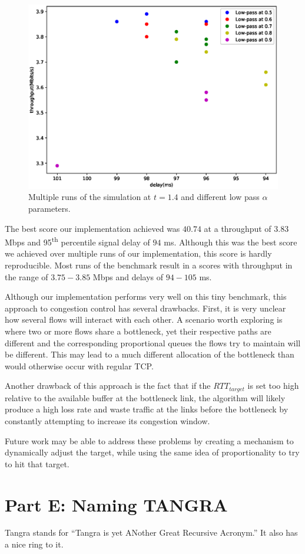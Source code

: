 \documentclass[12pt]{article}
\begin{document}
\begin{figure}[h]
\includegraphics[width=\textwidth,height=\textheight,keepaspectratio]{figure_2.eps}
\caption{Multiple runs of the simulation at $t=1.4$ and different low pass
$\alpha$ parameters.}
\label{fig:low-pass-1-4}
\end{figure}

The best score our implementation achieved was $40.74$ at a throughput of $3.83$
Mbps and 95\textsuperscript{th} percentile signal delay of $94$ ms.
Although this was the best score we achieved over multiple runs of our
implementation, this score is hardly reproducible. Most runs of the benchmark
result in a scores with throughput in the range of $3.75-3.85$ Mbps and delays
of $94-105$ ms.

Although our implementation performs very well on this tiny benchmark, this
approach to congestion control has several drawbacks. First, it is very unclear
how several flows will interact with each other. A scenario worth exploring is
where two or more flows share a bottleneck, yet their respective paths are
different and the corresponding proportional queues the flows try to maintain
will be different. This may lead to a much different allocation of the
bottleneck than would otherwise occur with regular TCP.

Another drawback of this approach is the fact that if the $RTT_{target}$ is set
too high relative to the available buffer at the bottleneck link, the algorithm
will likely produce a high loss rate and waste traffic at the links before the
bottleneck by constantly attempting to increase its congestion window.

Future work may be able to address these problems by creating a mechanism to
dynamically adjust the target, while using the same idea of proportionality to
try to hit that target.

\section*{Part E: Naming TANGRA}

Tangra stands for ``Tangra is yet ANother Great Recursive Acronym.'' It also has
a nice ring to it.

\pagebreak
\printbibliography
\end{document}
